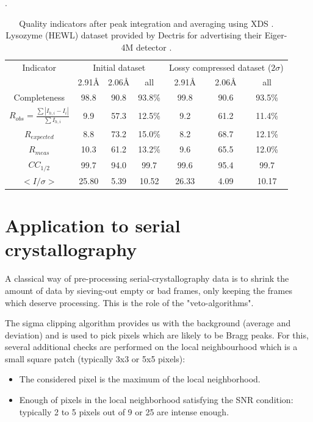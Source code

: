 \documentclass[preprint]{iucr}              %
\begin{document}
\begin{table}
\label{xds_summary}
\caption{Quality indicators after peak integration and averaging using XDS \cite{xds}. 
Lysozyme (HEWL) dataset provided by Dectris for advertising their Eiger-4M detector \cite{lysozyme}.}.
\begin{tabular}{|c|c c c|c c c|} 
\hline
Indicator & \multicolumn{3}{c|}{Initial dataset} & \multicolumn{3}{c|}{Lossy compressed dataset ($2\sigma$)} \\ 
          & 2.91\AA & 2.06\AA & all & 2.91\AA & 2.06\AA & all \\
\hline
Completeness                                        & 98.8& 90.8 & 93.8\% & 99.8& 90.6 & 93.5\% \\ 
$R_{obs}=\frac{\sum |I_{h,i}-I_{i}|}{\sum I_{h,i}}$ & 9.9 & 57.3& 12.5\% & 9.2 & 61.2&  11.4\%\\ 
$R_{expected}$                                      & 8.8 & 73.2& 15.0\% & 8.2 & 68.7 &  12.1\%\\
$R_{meas}$ \cite{Rmeas}  &10.3 &61.2& 13.2\% & 9.6 & 65.5 & 12.0\%\\
$CC_{1/2}$ \cite{cc1/2}  & 99.7 &94.0 & 99.7   & 99.6 & 95.4 & 99.7  \\
$<I/\sigma>$               & 25.80 & 5.39 & 10.52  & 26.33& 4.09 & 10.17 \\
\hline
\end{tabular}
\end{table}


\section{Application to serial crystallography}
A classical way of pre-processing serial-crystallography data is to shrink the amount of data by sieving-out empty or bad frames, only keeping the frames which deserve processing. 
This is the role of the "veto-algorithms".

The sigma clipping algorithm provides us with the background (average and deviation) and is used to pick pixels which are likely to be Bragg peaks. 
For this,  several additional checks are performed on the local neighbourhood which is a small square patch (typically 3x3 or 5x5 pixels):
\begin{itemize}
\item The considered pixel is the maximum of the local neighborhood.
\item Enough of pixels in the local neighborhood satisfying the SNR condition: typically 2 to 5 pixels out of 9 or 25 are intense enough.
\end{itemize}
\end{document}
